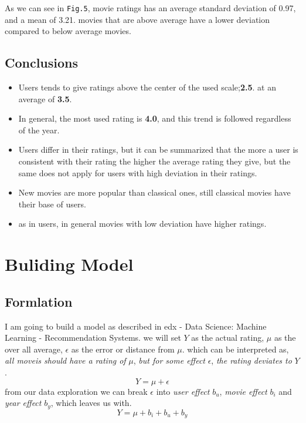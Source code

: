 \documentclass[]{article}
\providecommand{\tightlist}{%
  \setlength{\itemsep}{0pt}\setlength{\parskip}{0pt}}
\begin{document}
As we can see in \texttt{Fig.5}, movie ratings has an average standard
deviation of 0.97, and a mean of 3.21. movies that are above average
have a lower deviation compared to below average movies.

\subsection{Conclusions}\label{conclusions}

\begin{itemize}
\tightlist
\item
  Users tends to give ratings above the center of the used
  scale;\textbf{2.5}. at an average of \textbf{3.5}.
\item
  In general, the most used rating is \textbf{4.0}, and this trend is
  followed regardless of the year.
\item
  Users differ in their ratings, but it can be summarized that the more
  a user is consistent with their rating the higher the average rating
  they give, but the same does not apply for users with high deviation
  in their ratings.
\item
  New movies are more popular than classical ones, still classical
  movies have their base of users.
\item
  as in users, in general movies with low deviation have higher ratings.
\end{itemize}

\newpage

\section{Buliding Model}\label{buliding-model}

\subsection{Formlation}\label{formlation}

I am going to build a model as described in edx - Data Science: Machine
Learning - Recommendation Systems. we will set \(Y\) as the actual
rating, \(\mu\) as the over all average, \(\epsilon\) as the error or
distance from \(\mu\). which can be interpreted as, \emph{all moveis
should have a rating of} \(\mu\), \emph{but for some effect}
\(\epsilon\), \emph{the rating deviates to} \(Y\).
\[Y = \mu + \epsilon \] from our data exploration we can break
\(\epsilon\) into \emph{user effect} \(b_u\), \emph{movie effect}
\(b_i\) and \emph{year effect} \(b_y\), which leaves us with. \[
Y= \mu + b_i + b_u + b_y 
\]
\end{document}
